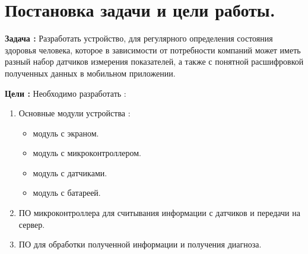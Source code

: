 \documentclass[a4document]{article}
\begin{document}
{
\newpage
\section*{Постановка задачи и цели работы.} 

\par\noindent
\textbf{Задача :}
\newline
Разработать устройство, для регулярного определения состояния здоровья человека, 
которое в зависимости от потребности компаний может иметь разный набор датчиков измерения показателей,
а также с понятной расшифровкой полученных данных в мобильном приложении. 

\bigbreak
\par\noindent
\textbf{Цели :}
\newline
Необходимо разработать : 
\begin{enumerate}
    \item Основные модули устройства : 
    \begin{itemize}
        \item модуль с экраном.
        \item модуль с микроконтроллером.
        \item модуль с датчиками. 
        \item модуль с батареей.
    \end{itemize}
    \item ПО микроконтроллера для считывания информации с датчиков и передачи на сервер.
    \item ПО для обработки полученной информации и получения диагноза.
\end{enumerate}

}
\end{document}

